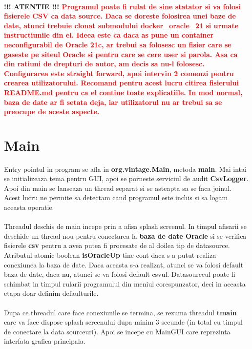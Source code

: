 \documentclass[oneside]{article}
\begin{document}
\paragraph{!!! ATENTIE !!! \textcolor{red}{Programul poate fi rulat de sine statator si va folosi fisierele CSV ca data source. Daca se doreste folosirea unei baze de date, atunci trebuie clonat submodului docker\_oracle\_21 si urmate instructiunile din el. Ideea este ca daca as pune un container neconfigurabil de Oracle 21c, ar trebui sa folosesc un fisier care se gaseste pe siteul Oracle si pentru care se cere user si parola. Asa ca din ratiuni de drepturi de autor, am decis sa nu-l folosesc. Configurarea este straight forward, apoi intervin 2 comenzi pentru crearea utilizatorului. Recomand pentru acest lucru citirea fisierului README.md pentru ca el contine toate explicatiile. In mod normal, baza de date ar fi setata deja, iar utilizatorul nu ar trebui sa se preocupe de aceste aspecte.}}

\section[Main]{Main}
\paragraph{}Entry pointul in program se afla in \textbf{org.vintage.Main}, metoda \textbf{main}. Mai intai se initializeaza tema pentru GUI, apoi se porneste serviciul de audit \textbf{CsvLogger}. Apoi din main se lanseaza un thread separat si se asteapta sa se faca joinul. Acest lucru ne permite sa detectam cand programul este inchis si sa logam aceasta operatie. 
\paragraph{} Threadul deschis de main incepe prin a afisa splash screenul. In timpul afisarii se deschide un thread nou pentru conectarea la \textbf{baza de date Oracle} si se verifica fisierele \textbf{csv} pentru a avea putea fi procesate de al doilea tip de datasource. Atributul atomic boolean \textbf{isOracleUp} tine cont daca s-a putut realiza conexiunea la baza de date. Daca aceasta s-a realizat, atunci se va folosi default baza de date, daca nu, atunci se va folosi default csvul. Datasourceul poate fi schimbat in timpul rularii programului din meniul corespunzator, deci in aceasta etapa doar definim defaulturile.
\paragraph{} Dupa ce threadul care face conexiunile se termina, se rezuma threadul \textbf{tmain} care va face dispose splash screenului dupa minim 3 secunde (in total cu timpul de conectare la data sourceuri). Apoi se incepe cu MainGUI care reprezinta interfata grafica principala.
\end{document}
